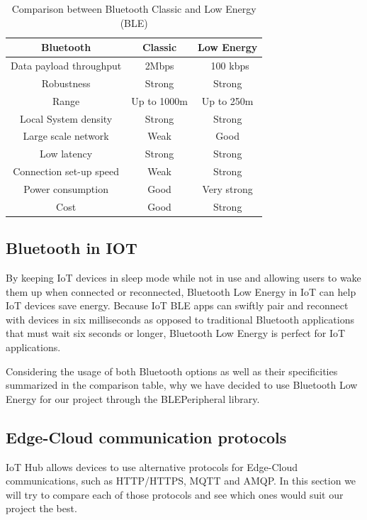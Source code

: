 \begin{table}[]
    \centering
    \begin{tabular}{|c|c|c|}
        \hline
        \textbf{Bluetooth} & \textbf{Classic} & \textbf{Low Energy}  \\
        \hline
        Data payload throughput & 2Mbps & ~100 kbps\\
        \hline
        Robustness & Strong & Strong\\
        \hline
        Range & Up to 1000m & Up to 250m\\
        \hline
        Local System density & Strong & Strong\\
        \hline
        Large scale network & Weak & Good\\
        \hline
        Low latency & Strong & Strong\\
        \hline
        Connection set-up speed & Weak & Strong\\
        \hline
        Power consumption & Good & Very strong\\
        \hline
        Cost & Good & Strong \\
        \hline
        \end{tabular}
    \caption{Comparison between Bluetooth Classic and Low Energy (BLE)}
    \label{tab:my_label}
\end{table}

\subsection{Bluetooth in IOT}
By keeping IoT devices in sleep mode while not in use and allowing users to wake them up when connected or reconnected, Bluetooth Low Energy in IoT can help IoT devices save energy. Because IoT BLE apps can swiftly pair and reconnect with devices in six milliseconds as opposed to traditional Bluetooth applications that must wait six seconds or longer, Bluetooth Low Energy is perfect for IoT applications.

Considering the usage of both Bluetooth options as well as their specificities summarized in the comparison table, why we have decided to use Bluetooth Low Energy for our project through the BLEPeripheral library.

\subsection{Edge-Cloud communication protocols}
IoT Hub allows devices to use alternative protocols for Edge-Cloud communications, such as HTTP/HTTPS, MQTT and AMQP. In this section we will try to compare each of those protocols and see which ones would suit our project the best.

